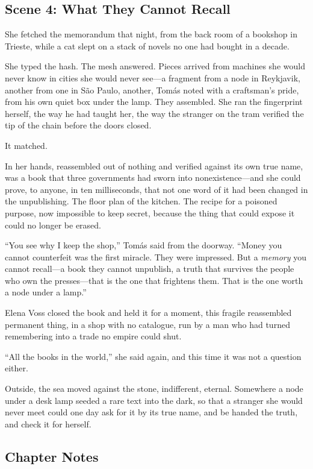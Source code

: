 \hypertarget{scene-4-what-they-cannot-recall}{%
\subsection{Scene 4: What They Cannot
Recall}\label{scene-4-what-they-cannot-recall}}

She fetched the memorandum that night, from the back room of a bookshop in
Trieste, while a cat slept on a stack of novels no one had bought in a decade.

She typed the hash. The mesh answered. Pieces arrived from machines she would never
know in cities she would never see---a fragment from a node in Reykjavik, another
from one in São Paulo, another, Tomás noted with a craftsman's pride, from his own
quiet box under the lamp. They assembled. She ran the fingerprint herself, the way
he had taught her, the way the stranger on the tram verified the tip of the chain
before the doors closed.

It matched.

In her hands, reassembled out of nothing and verified against its own true name,
was a book that three governments had sworn into nonexistence---and she could prove,
to anyone, in ten milliseconds, that not one word of it had been changed in the
unpublishing. The floor plan of the kitchen. The recipe for a poisoned purpose,
now impossible to keep secret, because the thing that could expose it could no
longer be erased.

``You see why I keep the shop,'' Tomás said from the doorway. ``Money you cannot
counterfeit was the first miracle. They were impressed. But a \emph{memory} you
cannot recall---a book they cannot unpublish, a truth that survives the people who
own the presses---that is the one that frightens them. That is the one worth a
node under a lamp.''

Elena Voss closed the book and held it for a moment, this fragile reassembled
permanent thing, in a shop with no catalogue, run by a man who had turned
remembering into a trade no empire could shut.

``All the books in the world,'' she said again, and this time it was not a question
either.

Outside, the sea moved against the stone, indifferent, eternal. Somewhere a node
under a desk lamp seeded a rare text into the dark, so that a stranger she would
never meet could one day ask for it by its true name, and be handed the truth, and
check it for herself.

\hypertarget{chapter-11-notes}{%
\subsection{Chapter Notes}\label{chapter-11-notes}}

